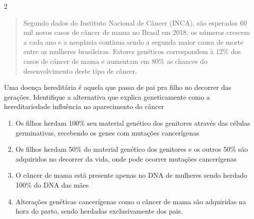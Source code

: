\num{2}
\begin{quote}
Segundo dados do Instituto Nacional de Câncer (INCA), são esperados
60 mil novos casos de câncer de mama no Brasil em 2018, os números
crescem a cada ano e a neoplasia continua sendo a segunda maior causa
de morte entre as mulheres brasileiras. Fatores genéticos correspondem
à 12\% dos casos de câncer de mama e aumentam em 80\% as chances do
desenvolvimento deste tipo de câncer.

\end{quote}

Uma doença hereditária é aquela que passa de pai pra filho no decorrer
das gerações. Identifique a alternativa que explica geneticamente como a
hereditariedade influência no aparecimento do câncer

\begin{enumerate}
\item
  Os filhos herdam 100\% seu material genético dos genitores através das
  células germinativas, recebendo os genes com mutações cancerígenas
\item
  Os filhos herdam 50\% do material genético dos genitores e os outros
  50\% são adquiridos no decorrer da vida, onde pode ocorrer mutações
  cancerígenas
\item
  O câncer de mama está presente apenas no DNA de mulheres sendo herdado
  100\% do DNA das mães
\item
  Alterações genéticas cancerígenas como o câncer de mama são adquiridas
  na hora do parto, sendo herdadas exclusivamente dos pais.
\end{enumerate}


